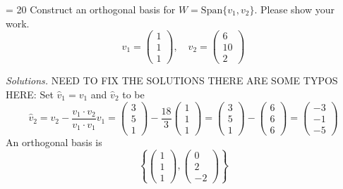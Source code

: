 \ifnum \Version = 20 %
\question[2] Construct an orthogonal basis for $W = \text{Span}\{v_1,v_2\}$. Please show your work. 
$$v_1 = \begin{pmatrix} 1\\1\\1\end{pmatrix}, \quad v_2 = \begin{pmatrix} 6\\10\\2\end{pmatrix}$$

\ifnum {} {\color{DarkBlue} \textit{Solutions.} NEED TO FIX THE SOLUTIONS THERE ARE SOME TYPOS HERE: Set $\hat v_1 = v_1$ and $\hat v_2$ to be
$$\hat v_2 = v_2 - \frac{v_1\cdot v_2}{v_1\cdot v_1} v_1 = \begin{pmatrix} 3\\5\\1\end{pmatrix} - \frac{18}{3}\begin{pmatrix} 1\\1\\1\end{pmatrix} = \begin{pmatrix} 3\\5\\1\end{pmatrix} -\begin{pmatrix} 6\\6\\6\end{pmatrix}= \begin{pmatrix}-3\\-1\\-5 \end{pmatrix}$$ An orthogonal basis is $$\left\{ \begin{pmatrix}1\\1\\1 \end{pmatrix}, \begin{pmatrix} 0\\2\\-2\end{pmatrix}\right\}$$
}
\fi
\fi